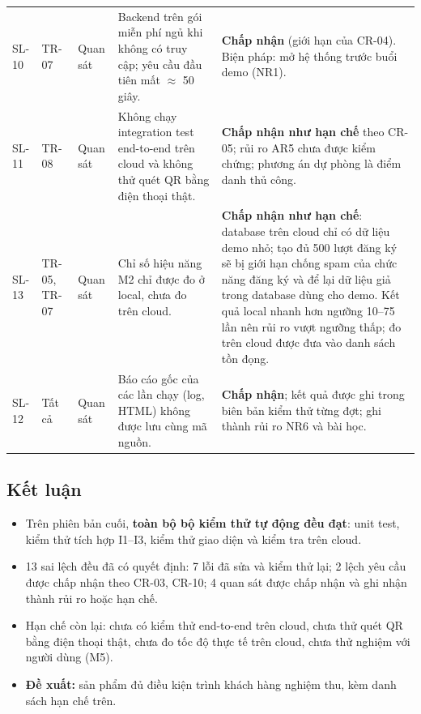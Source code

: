 \begin{longtable}{@{}p{.07\linewidth}p{.08\linewidth}p{.10\linewidth}p{.30\linewidth}p{.36\linewidth}@{}}
SL-10 & TR-07 & Quan sát & Backend trên gói miễn phí ngủ khi không có truy cập; yêu cầu đầu tiên mất $\approx$ 50 giây. & \textbf{Chấp nhận} (giới hạn của CR-04). Biện pháp: mở hệ thống trước buổi demo (NR1).\\
SL-11 & TR-08 & Quan sát & Không chạy integration test end-to-end trên cloud và không thử quét QR bằng điện thoại thật. & \textbf{Chấp nhận như hạn chế} theo CR-05; rủi ro AR5 chưa được kiểm chứng; phương án dự phòng là điểm danh thủ công.\\
SL-13 & TR-05, TR-07 & Quan sát & Chỉ số hiệu năng M2 chỉ được đo ở local, chưa đo trên cloud. & \textbf{Chấp nhận như hạn chế}: database trên cloud chỉ có dữ liệu demo nhỏ; tạo đủ 500 lượt đăng ký sẽ bị giới hạn chống spam của chức năng đăng ký và để lại dữ liệu giả trong database dùng cho demo. Kết quả local nhanh hơn ngưỡng 10--75 lần nên rủi ro vượt ngưỡng thấp; đo trên cloud được đưa vào danh sách tồn đọng.\\
SL-12 & Tất cả & Quan sát & Báo cáo gốc của các lần chạy (log, HTML) không được lưu cùng mã nguồn. & \textbf{Chấp nhận}; kết quả được ghi trong biên bản kiểm thử từng đợt; ghi thành rủi ro NR6 và bài học.\\
\end{longtable}
\endgroup

\subsection{Kết luận}

\begin{itemize}
    \item Trên phiên bản cuối, \textbf{toàn bộ bộ kiểm thử tự động đều đạt}: unit test, kiểm thử tích hợp I1--I3, kiểm thử giao diện và kiểm tra trên cloud.
    \item 13 sai lệch đều đã có quyết định: 7 lỗi đã sửa và kiểm thử lại; 2 lệch yêu cầu được chấp nhận theo CR-03, CR-10; 4 quan sát được chấp nhận và ghi nhận thành rủi ro hoặc hạn chế.
    \item Hạn chế còn lại: chưa có kiểm thử end-to-end trên cloud, chưa thử quét QR bằng điện thoại thật, chưa đo tốc độ thực tế trên cloud, chưa thử nghiệm với người dùng (M5).
    \item \textbf{Đề xuất:} sản phẩm đủ điều kiện trình khách hàng nghiệm thu, kèm danh sách hạn chế trên.
\end{itemize}
